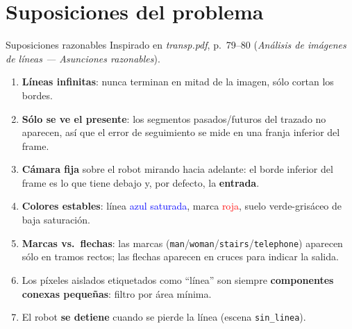 %


\section{Suposiciones del problema}

\begin{frame}{Suposiciones razonables}
Inspirado en \emph{transp.pdf}, p.~79--80 (\textit{Análisis de imágenes de líneas — Asunciones razonables}).
\begin{enumerate}\setlength\itemsep{2pt}
  \item \textbf{Líneas infinitas}: nunca terminan en mitad de la imagen, sólo cortan los bordes.
  \item \textbf{Sólo se ve el presente}: los segmentos pasados/futuros del trazado no aparecen, así que el error de seguimiento se mide en una franja inferior del frame.
  \item \textbf{Cámara fija} sobre el robot mirando hacia adelante: el borde inferior del frame es lo que tiene debajo y, por defecto, la \textbf{entrada}.
  \item \textbf{Colores estables}: línea \textcolor{blue}{azul saturada}, marca \textcolor{red}{roja}, suelo verde-grisáceo de baja saturación.
  \item \textbf{Marcas vs.\ flechas}: las marcas (\texttt{man}/\texttt{woman}/\texttt{stairs}/\texttt{telephone}) aparecen sólo en tramos rectos; las flechas aparecen en cruces para indicar la salida.
  \item Los píxeles aislados etiquetados como ``línea'' son siempre \textbf{componentes conexas pequeñas}: filtro por área mínima.
  \item El robot \textbf{se detiene} cuando se pierde la línea (escena \texttt{sin\_linea}).
\end{enumerate}
\end{frame}


